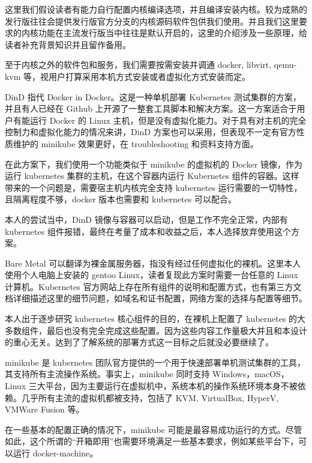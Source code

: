 这里我们假设读者有能力自行配置内核编译选项，并且编译安装内核。较为成熟的发行版往往会提供发行版官方分支的内核源码软件包供我们使用。并且我们这里要求的内核功能在主流发行版当中往往是默认开启的，这里的介绍涉及一些原理，给读者补充背景知识并且留作备用。

至于内核之外的软件包和服务，我们需要按需安装并调通 docker, libvirt, qemu-kvm 等，视用户打算采用本机方式安装或者虚拟化方式安装而定。


DinD 指代 Docker in Docker。这是一种单机部署 Kubernetes 测试集群的方案，并且有人已经在 Github 上开源了一整套工具脚本和解决方案。这一方案适合于用户有能运行 Docker 的 Linux 主机，但是没有虚拟化能力。对于具有对主机的完全控制力和虚拟化能力的情况来讲，DinD 方案也可以采用，但表现不一定有官方性质维护的 minikube 效果更好，在 troubleshooting 和资料支持方面。

在此方案下，我们使用一个功能类似于 minikube 的虚拟机的 Docker 镜像，作为运行 kubernetes 集群的主机，在这个容器内运行 Kubernetes 组件的容器。这样带来的一个问题是，需要宿主机内核完全支持 kubernetes 运行需要的一切特性，且隔离程度不够，docker 版本也需要和 kubernetes 可以配合。

本人的尝试当中，DinD 镜像与容器可以启动，但是工作不完全正常，内部有 kubernetes 组件报错，最终在考量了成本和收益之后，本人选择放弃使用这个方案。


Bare Metal 可以翻译为裸金属服务器，指没有经过任何虚拟化的裸机。这里本人使用个人电脑上安装的 gentoo Linux，读者复现此方案时需要一台任意的 Linux 计算机。Kubernetes 官方网站上存在所有组件的说明和配置方式，也有第三方文档详细描述这里的细节问题，如域名和证书配置，网络方案的选择与配置等细节。

本人出于逐步研究 kubernetes 核心组件的目的，在裸机上配置了 kubernetes 的大多数组件，最后也没有完全完成这些配置。因为这些内容工作量极大并且和本设计的重心无关。达到了了解系统的部署方式这一目标之后就没必要继续了。



minikube 是 kubernetes 团队官方提供的一个用于快速部署单机测试集群的工具，其支持所有主流操作系统。事实上，minikube 同时支持 Windows，macOS，Linux 三大平台，因为主要运行在虚拟机中，系统本机的操作系统环境本身不被依赖。几乎所有主流的虚拟机都被支持，包括了 KVM, VirtualBox, HyperV, VMWare Fusion 等。

在一些基本的配置正确的情况下，minikube 可能是最容易成功运行的方式。尽管如此，这个所谓的“开箱即用”也需要环境满足一些基本要求，例如某些平台下，可以运行 docker-machine。

